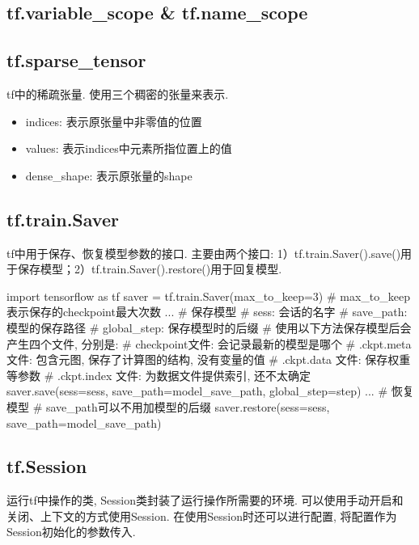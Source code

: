 \subsection{tf.variable\_scope \& tf.name\_scope}

\subsection{tf.sparse\_tensor}	tf中的稀疏张量. 使用三个稠密的张量来表示. 
\begin{itemize}
	\item indices: 表示原张量中非零值的位置
	\item values: 表示indices中元素所指位置上的值
	\item dense\_shape: 表示原张量的shape
\end{itemize}

\subsection{tf.train.Saver}tf中用于保存、恢复模型参数的接口. 主要由两个接口: 1）tf.train.Saver().save()用于保存模型；2）tf.train.Saver().restore()用于回复模型. 
\begin{python}
	import tensorflow as tf
	saver = tf.train.Saver(max\_to\_keep=3) # max\_to\_keep表示保存的checkpoint最大次数
	...
	# 保存模型
	# sess: 会话的名字
	# save\_path: 模型的保存路径
	# global\_step: 保存模型时的后缀
	# 使用以下方法保存模型后会产生四个文件, 分别是: 
	# checkpoint文件: 会记录最新的模型是哪个
	# .ckpt.meta文件: 包含元图, 保存了计算图的结构, 没有变量的值
	# .ckpt.data 文件: 保存权重等参数
	# .ckpt.index 文件: 为数据文件提供索引, {还不太确定}
	saver.save(sess=sess, save_path=model_save_path, global_step=step)
	...
	# 恢复模型
	# save_path可以不用加模型的后缀
	saver.restore(sess=sess, save_path=model_save_path)
\end{python}

\subsection{tf.Session}运行tf中操作的类, Session类封装了运行操作所需要的环境. 可以使用手动开启和关闭、上下文的方式使用Session. 在使用Session时还可以进行配置, 将配置作为Session初始化的参数传入. 

